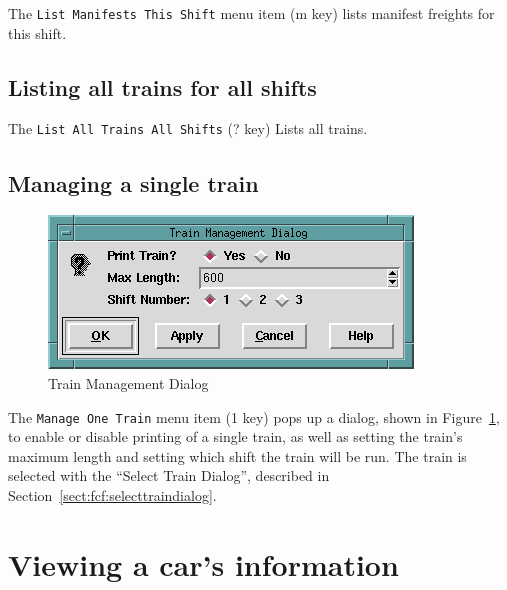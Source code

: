 The \verb=List Manifests This Shift= menu item (m key) lists manifest
freights for this shift.

\subsection{Listing all trains for all shifts}

The \verb=List All Trains All Shifts= (? key) Lists all trains.

\subsection{Managing a single train}

\begin{figure}[hbpt]
\begin{centering}
\includegraphics{FCFManage1TrainDialog.png}
\caption{Train Management Dialog}
\label{fig:fcf:manage1train}
\end{centering}
\end{figure}
The \verb=Manage One Train= menu item (1 key) pops up a dialog, shown
in Figure~\ref{fig:fcf:manage1train}, to enable or disable printing of
a single train, as well as setting the train's maximum length and
setting which shift the train will be run.  The train is selected with
the ``Select Train Dialog'', described in
Section~\ref{sect:fcf:selecttraindialog}.

\section{Viewing a car's information}

